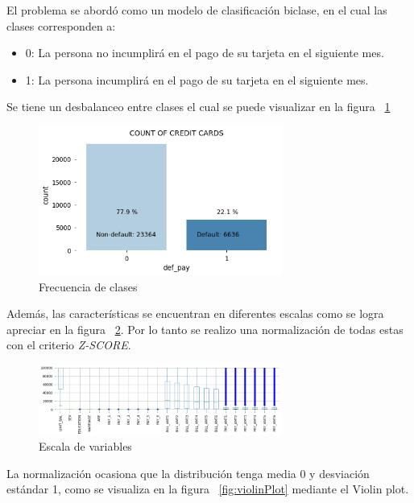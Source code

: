 \documentclass[conference]{IEEEtran}
\begin{document}
El problema se abordó como un modelo de clasificación biclase, en el cual las clases corresponden a: 

\begin{itemize}
\item 0: La persona no incumplirá en el pago de su tarjeta en el siguiente mes.
\item 1: La persona incumplirá en el pago de su tarjeta en el siguiente mes.
\end{itemize}
Se tiene un desbalanceo entre clases el cual se puede visualizar en la figura ~\ref{fig:frecuenciaClases}
\begin{center}
    \begin{figure}[H]
        \hfill
            \includegraphics[width=8cm]{desbalnaceo.png}\hspace*{\fill}
    \caption{Frecuencia de clases}
    \label{fig:frecuenciaClases}
    \end{figure}  
\end{center}
Además, las características se encuentran en diferentes escalas como se logra apreciar en la figura ~\ref{fig:escalaVariables}. Por lo tanto se realizo una normalización de todas estas con el criterio \textit{Z-SCORE}. 
\begin{center}
    \begin{figure}[H]
        \hfill
            \includegraphics[width=8cm]{escala.png}\hspace*{\fill}
    \caption{Escala de variables}
    \label{fig:escalaVariables}
    \end{figure}  
\end{center}
La normalización ocasiona que la distribución tenga media 0 y desviación estándar 1, como se visualiza en la figura ~\ref{fig:violinPlot} mediante el Violin plot.
\end{document}
